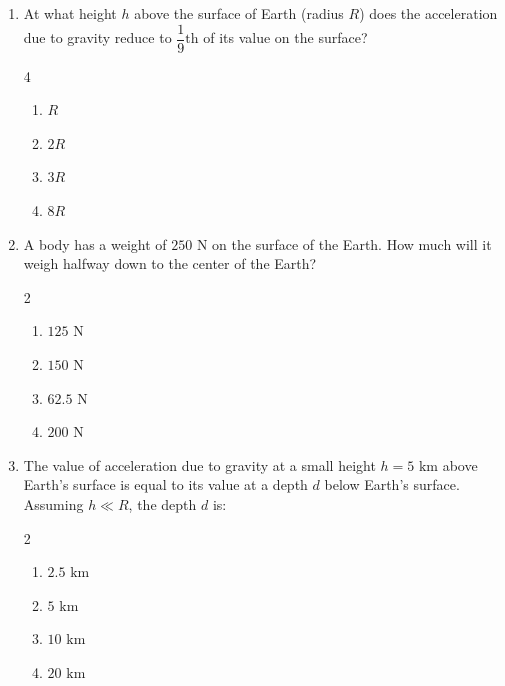 \documentclass[11pt,a4paper]{article}
\begin{document}
\begin{enumerate}[label=\textbf{\arabic*.},leftmargin=18pt,itemsep=10pt]

  \item At what height $h$ above the surface of Earth (radius $R$) does the acceleration due to gravity reduce to $\dfrac{1}{9}\text{th}$ of its value on the surface?
  \begin{multicols}{4}
    \begin{enumerate}[label=(\Alph*)]
      \item $R$
      \item $2R$
      \item $3R$
      \item $8R$
    \end{enumerate}
  \end{multicols}

  \item A body has a weight of $250\text{ N}$ on the surface of the Earth. How much will it weigh halfway down to the center of the Earth?
  \begin{multicols}{2}
    \begin{enumerate}[label=(\Alph*)]
      \item $125\text{ N}$
      \item $150\text{ N}$
      \item $62.5\text{ N}$
      \item $200\text{ N}$
    \end{enumerate}
  \end{multicols}

  \item The value of acceleration due to gravity at a small height $h = 5\text{ km}$ above Earth's surface is equal to its value at a depth $d$ below Earth's surface. Assuming $h \ll R$, the depth $d$ is:
  \begin{multicols}{2}
    \begin{enumerate}[label=(\Alph*)]
      \item $2.5\text{ km}$
      \item $5\text{ km}$
      \item $10\text{ km}$
      \item $20\text{ km}$
    \end{enumerate}
  \end{multicols}


\end{enumerate}
\end{document}
